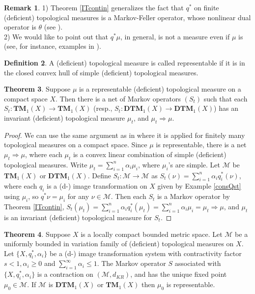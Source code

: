 \documentclass[sn-mathphys-num]{sn-jnl}%
\theoremstyle{thmstyleone}%
\theoremstyle{definition}
\newtheorem{theorem}{Theorem}%
\newtheorem{definition}[theorem]{Definition}
\newtheorem{remark}[theorem]{Remark}
\begin{document}
\begin{remark}
1) Theorem \ref{ITcontin} generalizes the fact that  $q^*$  on finite (deficient) topological measures is a Markov-Feller operator, 
whose nonlinear dual operator is $\theta$ (see \cite[Sect. 5]{Butler:QLM}). \\
2) We would like to point out that $q^* \mu$, in general, is not a measure even if $ \mu$ is (see, for instance, examples in \cite[Sect. 2]{Butler:QLM}). 
\end{remark}

\begin{definition}
A (deficient) topological measure is called representable if it is in the closed convex hull of simple (deficient) topological measures. 
\end{definition}

\begin{theorem} \label{ITnet}
Suppose $\mu$ is a representable (deficient) topological measure on a compact space $X$.
Then there is a net of Markov operators $(S_t)$  
such that each $S_t:  \mathbf{TM}_1(X) \longrightarrow \mathbf{TM}_1(X)$ (resp., $S_t:  \mathbf{DTM}_1(X) \longrightarrow \mathbf{DTM}_1(X)$)
has an invariant (deficient) topological measure $\mu_t$, and
$ \mu_t \Longrightarrow \mu$. 
\end{theorem}

\begin{proof}
We  can use the same argument as in \cite[Pr. 5.12]{Pedersen}  where it is applied for finitely many topological measures on a compact space. 
Since $\mu$ is representable, there is a net $\mu_t  \Longrightarrow \mu$, where each $\mu_t$ is a convex linear combination of simple 
(deficient) topological measures. Write $\mu_t = \sum_{i=1}^n \alpha_i \mu_i$, where  $\mu_i$'s are simple. 
Let $\mathcal{M}$ be $\mathbf{TM}_1(X)$ or $\mathbf{DTM}_1(X)$.   
Define $S_t: \mathcal{M} \longrightarrow \mathcal{M}$ as 
$S_t(\nu) = \sum_{i=1}^n \alpha_i q_i^*(\nu)$, 
where each  $q_i$ is a (d-) image transformation on $X$ 
given by Example \ref{consQst} using $\mu_i$, so $q^* \nu = \mu_i$ for any $ \nu \in \mathcal{M}$.
Then  each $S_t$ is a Markov operator by Theorem \ref{ITcontin},  
$S_t(\mu_t) =\sum_{i=1}^n \alpha_i  q_i^*(\mu_t) =   \sum_{i=1}^n \alpha_i \mu_i = \mu_t \Longrightarrow \mu$,
and $\mu_t$ is an invariant (deficient) topological measure for $S_t$. 
\end{proof}

\begin{theorem} \label{FractIT}
Suppose $X$ is a locally compact bounded metric space. 
Let $\mathcal{M}$ be a uniformly bounded in variation family of (deficient) topological measures on $X$.
Let $\{ X, q_i^*, \alpha_i \} $ be a (d-) image transformation system with contractivity factor  
$s <1, \alpha_i \ge 0$ and $\sum_{i=1}^\infty \alpha_i \le 1$.
The  Markov operator $S$ associated with $\{ X, q_i^*, \alpha_i \} $ 
is a contraction on $(\mathcal{M}, d_{KR})$, and has the unique 
fixed point $\mu_0 \in \mathcal{M}$. If $\mathcal{M}$ is  $\mathbf{DTM}_1(X)$ or $ \mathbf{TM}_1(X)$ then $\mu_0$ is representable. 
\end{theorem}
\end{document}
